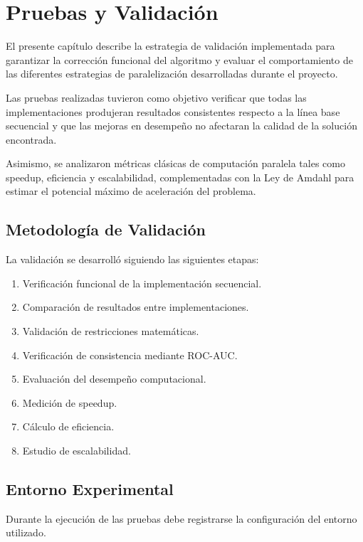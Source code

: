 \chapter{Pruebas y Validación}

El presente capítulo describe la estrategia de validación implementada para garantizar la corrección funcional del algoritmo y evaluar el comportamiento de las diferentes estrategias de paralelización desarrolladas durante el proyecto.

Las pruebas realizadas tuvieron como objetivo verificar que todas las implementaciones produjeran resultados consistentes respecto a la línea base secuencial y que las mejoras en desempeño no afectaran la calidad de la solución encontrada.

Asimismo, se analizaron métricas clásicas de computación paralela tales como speedup, eficiencia y escalabilidad, complementadas con la Ley de Amdahl para estimar el potencial máximo de aceleración del problema.

\section{Metodología de Validación}

La validación se desarrolló siguiendo las siguientes etapas:

\begin{enumerate}
    \item Verificación funcional de la implementación secuencial.
    \item Comparación de resultados entre implementaciones.
    \item Validación de restricciones matemáticas.
    \item Verificación de consistencia mediante ROC-AUC.
    \item Evaluación del desempeño computacional.
    \item Medición de speedup.
    \item Cálculo de eficiencia.
    \item Estudio de escalabilidad.
\end{enumerate}

\section{Entorno Experimental}

Durante la ejecución de las pruebas debe registrarse la configuración del entorno utilizado.


